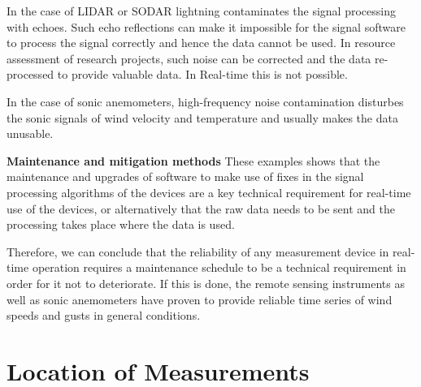In the case of LIDAR or SODAR lightning contaminates the signal processing with echoes. Such echo reflections can make it impossible for the signal software to process the signal correctly and hence the data cannot be used.
In resource assessment of research projects, such noise can be corrected and the data re-processed to provide valuable data. In Real-time this is not possible. 

In the case of sonic anemometers, high-frequency noise contamination disturbes the sonic signals of wind velocity and temperature and usually makes the data unusable.

\textbf{Maintenance and mitigation methods}
These examples shows that the maintenance and upgrades of software to make use of fixes in the signal processing algorithms of the devices are a key technical requirement for real-time use of the devices, or alternatively that the raw data needs to be sent and the processing takes place where the data is used. 

Therefore, we can conclude that the reliability of any measurement device in real-time operation requires a maintenance schedule to be a technical requirement in order for it not to deteriorate. If this is done, the remote sensing instruments as well as sonic anemometers have proven to provide reliable time series of wind speeds and gusts in general conditions. 





\section{Location of Measurements}\label{sec:location-of-measurements}
        
{\color{magenta}{Comment SW,  COM (21.08.2021): Add an introductory paragraph under 3.1 to describe the issue - that the objective is to make measurements that are well correlated to the power generation (wind or solar) and what issues affect that correlation.}}



